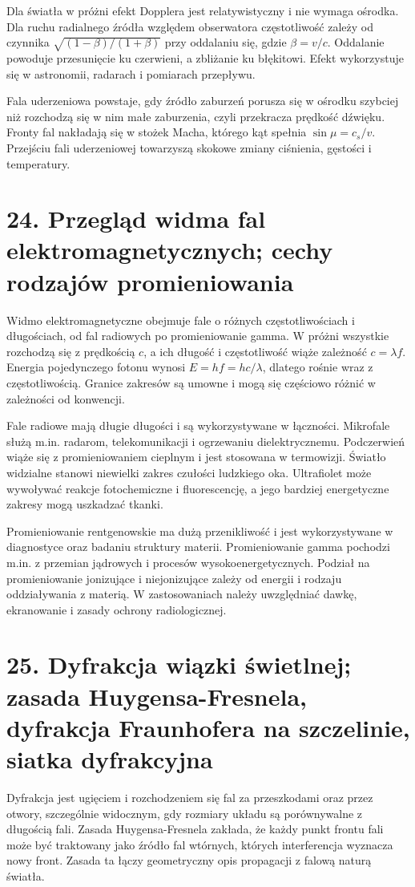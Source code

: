 \documentclass[11pt,a4paper,oneside]{report}
\begin{document}
Dla światła w próżni efekt Dopplera jest relatywistyczny i nie wymaga ośrodka. Dla ruchu radialnego źródła względem obserwatora częstotliwość zależy od czynnika \(\sqrt{(1-\beta)/(1+\beta)}\) przy oddalaniu się, gdzie \(\beta=v/c\). Oddalanie powoduje przesunięcie ku czerwieni, a zbliżanie ku błękitowi. Efekt wykorzystuje się w astronomii, radarach i pomiarach przepływu.

Fala uderzeniowa powstaje, gdy źródło zaburzeń porusza się w ośrodku szybciej niż rozchodzą się w nim małe zaburzenia, czyli przekracza prędkość dźwięku. Fronty fal nakładają się w stożek Macha, którego kąt spełnia \(\sin\mu=c_s/v\). Przejściu fali uderzeniowej towarzyszą skokowe zmiany ciśnienia, gęstości i temperatury.

\section{24. Przegląd widma fal elektromagnetycznych; cechy rodzajów promieniowania}
Widmo elektromagnetyczne obejmuje fale o różnych częstotliwościach i długościach, od fal radiowych po promieniowanie gamma. W próżni wszystkie rozchodzą się z prędkością \(c\), a ich długość i częstotliwość wiąże zależność \(c=\lambda f\). Energia pojedynczego fotonu wynosi \(E=hf=hc/\lambda\), dlatego rośnie wraz z częstotliwością. Granice zakresów są umowne i mogą się częściowo różnić w zależności od konwencji.

Fale radiowe mają długie długości i są wykorzystywane w łączności. Mikrofale służą m.in. radarom, telekomunikacji i ogrzewaniu dielektrycznemu. Podczerwień wiąże się z promieniowaniem cieplnym i jest stosowana w termowizji. Światło widzialne stanowi niewielki zakres czułości ludzkiego oka. Ultrafiolet może wywoływać reakcje fotochemiczne i fluorescencję, a jego bardziej energetyczne zakresy mogą uszkadzać tkanki.

Promieniowanie rentgenowskie ma dużą przenikliwość i jest wykorzystywane w diagnostyce oraz badaniu struktury materii. Promieniowanie gamma pochodzi m.in. z przemian jądrowych i procesów wysokoenergetycznych. Podział na promieniowanie jonizujące i niejonizujące zależy od energii i rodzaju oddziaływania z materią. W zastosowaniach należy uwzględniać dawkę, ekranowanie i zasady ochrony radiologicznej.

\section{25. Dyfrakcja wiązki świetlnej; zasada Huygensa-Fresnela, dyfrakcja Fraunhofera na szczelinie, siatka dyfrakcyjna}
Dyfrakcja jest ugięciem i rozchodzeniem się fal za przeszkodami oraz przez otwory, szczególnie widocznym, gdy rozmiary układu są porównywalne z długością fali. Zasada Huygensa-Fresnela zakłada, że każdy punkt frontu fali może być traktowany jako źródło fal wtórnych, których interferencja wyznacza nowy front. Zasada ta łączy geometryczny opis propagacji z falową naturą światła.
\end{document}
